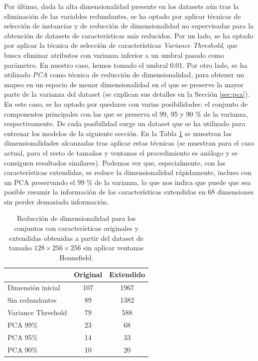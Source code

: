Por último, dada la alta dimensionalidad presente en los datasets aún tras la eliminación de las variables redundantes, se ha optado por aplicar técnicas de selección de instancias y de reducción de dimensionalidad no supervisadas para la obtención de datasets de características más reducidos. Por un lado, se ha optado por aplicar la técnica de selección de características \emph{Variance Threshold}, que busca eliminar atributos con varianza inferior a un umbral pasado como parámetro. En nuestro caso, hemos tomado el umbral 0.01. Por otro lado, se ha utilizado \emph{PCA} como técnica de reducción de dimensionalidad, para obtener un mapeo en un espacio de menor dimensionalidad en el que se preserve la mayor parte de la varianza del dataset (se explican sus detalles en la Sección \ref{sec:pca}). En este caso, se ha optado por quedarse con varias posibilidades: el conjunto de componentes principales con las que se preserva el 99, 95 y 90 \% de la varianza, respectivamente. De cada posibilidad surge un dataset que se ha utilizado para entrenar los modelos de la siguiente sección. En la Tabla \ref{tbl:red_dim} se muestran las dimensionalidades alcanzadas tras aplicar estas técnicas (se muestran para el caso actual, para el resto de tamaños y ventanas el procedimiento es análogo y se consiguen resultados similares). Podemos ver que, especialmente, con las características extendidas, se reduce la dimensionalidad rápidamente, incluso con un PCA preservando el 99 \% de la varianza, lo que nos indica que puede que sea posible resumir la información de las características extendidas en 68 dimensiones sin perder demasiada información.

\begin{table}[!htbp]
\centering
\begin{tabular}{lcc}
\hline
 & \textbf{Original} & \textbf{Extendido} \\
\hline
Dimensión inicial       & 107 & 1967 \\
Sin redundantes         & 89  & 1382 \\
Variance Threshold      & 79  & 588  \\
PCA 99\%                 & 23  & 68   \\
PCA 95\%                 & 14  & 33   \\
PCA 90\%                 & 10  & 20   \\
\hline
\end{tabular}
\caption{Reducción de dimensionalidad para los conjuntos con características originales y extendidas obtenidas a partir del dataset de tamaño $128\times 256 \times 256$ sin aplicar ventanas Hounsfield.}
\label{tbl:red_dim}
\end{table}


